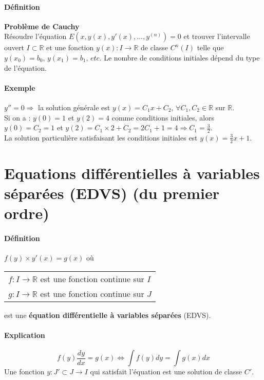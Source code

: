 \documentclass[1Opt]{report}
\begin{document}
\paragraph{Définition}
\textbf{Problème de Cauchy}\\
Résoudre l'équation $E\left(x,y(x),y'(x),\ldots,y^{(n)}\right)=0$ et trouver
l'intervalle ouvert $I\subset{\mathbb R}$ et une fonction
$y(x):I\rightarrow{\mathbb R}$ de classe $C^n(I)$ telle que
$y(x_0)=b_0,\,y(x_1)=b_1,\, etc$. Le nombre de conditions initiales dépend du
type de l'équation.

\paragraph{Exemple}
$y''=0\Rightarrow$ la solution générale est
$y(x)=C_1x+C_2,\,\forall C_1,C_2\in{\mathbb R}$ sur ${\mathbb R}$. \\
Si on a : $y(0)=1$ et $y(2)=4$ comme conditions initiales, alors $y(0)=C_2=1$ et
$y(2)=C_1\times 2+C_2=2C_1+1=4\Rightarrow C_1=\frac{3}{2}$.\\
La solution particulière satisfaisant les conditions initiales est $y(x)=
\frac{3}{2}x+1$.

\section{Equations différentielles à variables séparées (EDVS) (du premier ordre)}

\paragraph{Définition}
$f(y)\times y'(x)=g(x)$ où
\begin{tabular}{l}
  $f:I\rightarrow{\mathbb R}$ est une fonction continue sur $I$ \\
  $g:I\rightarrow{\mathbb R}$ est une fonction continue sur $J$ \\
\end{tabular}
est une \textbf{équation différentielle à variables séparées} (EDVS).

\paragraph{Explication}
\[ f(y)\frac{dy}{dx}=g(x)\Leftrightarrow\int{f(y)dy}=\int{g(x)dx}\]
Une fonction $y:J'\subset J\rightarrow I$ qui satisfait l'équation est une
solution de classe $C'$.
\end{document}
